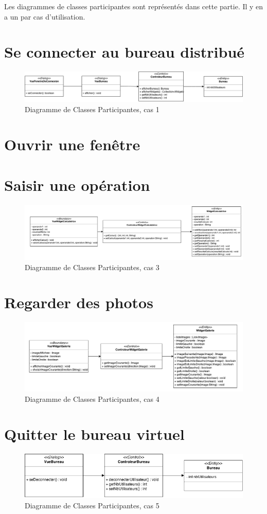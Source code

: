 Les diagrammes de classes participantes sont représentés dans cette 
partie. Il y en a un par cas d'utilisation.

\section{Se connecter au bureau distribué}

\begin{figure}[H]
	\centering
	\includegraphics[scale=0.45]{diagrammes/DCP1.png}
	\caption{Diagramme de Classes Participantes, cas 1}
\end{figure}

\section{Ouvrir une fenêtre}


\section{Saisir une opération}
\noindent\begin{figure}[H]
	\centering
	\includegraphics[angle=90,scale=0.9]{diagrammes/DCP3.pdf}
	\caption{Diagramme de Classes Participantes, cas 3}
\end{figure}

\section{Regarder des photos}
\begin{figure}[H]
	\centering
	\includegraphics[angle=90]{diagrammes/DCP4.pdf}
	\caption{Diagramme de Classes Participantes, cas 4}
\end{figure}

\section{Quitter le bureau virtuel}

\begin{figure}[H]
	\centering
	\includegraphics[scale=0.6]{diagrammes/DCP5.png}
	\caption{Diagramme de Classes Participantes, cas 5}
\end{figure}